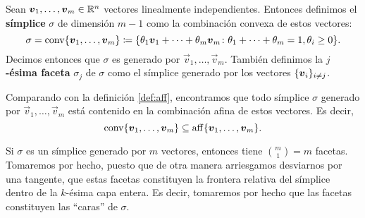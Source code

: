 \begin{definition}
	\label{def:simplex}
	Sean $\boldsymbol{v}_1, \ldots, \boldsymbol{v}_m \in \mathbb{R}^n$ vectores linealmente
	independientes. Entonces definimos el \textbf{símplice} $\sigma$ de
	dimensión $m - 1$ como la combinación convexa de estos vectores:
	\begin{equation*}
		\sigma = \operatorname{conv}\lbrace \boldsymbol{v}_1, \ldots, \boldsymbol{v}_m \rbrace
		\coloneq
		\lbrace \theta_1\boldsymbol{v}_1 + \cdots + \theta_m\boldsymbol{v}_m
		\colon \theta_1 + \cdots + \theta_m = 1, \theta_i \geq 0 \rbrace.
	\end{equation*}
	Decimos entonces que $\sigma$ es generado por $\vec{v}_1, \ldots, \vec{v}_m$. También definimos
	la \textbf{$j$-ésima faceta} $\sigma_j$ de $\sigma$ como el símplice generado por los vectores
	$\lbrace \boldsymbol{v}_i \rbrace_{i \neq j}$.
\end{definition}
\begin{observation}
	Comparando con la definición \ref{def:aff}, encontramos que todo símplice $\sigma$ generado por
	$\vec{v}_1, \ldots, \vec{v}_m$ está contenido en la combinación afina de estos vectores. Es
	decir,
	\begin{equation}
		\label{aff:contention}
		\operatorname{conv}\lbrace \boldsymbol{v}_1, \ldots, \boldsymbol{v}_m \rbrace \subseteq
		\operatorname{aff}\lbrace \boldsymbol{v}_1, \ldots, \boldsymbol{v}_m \rbrace.
	\end{equation}
\end{observation}
\begin{observation}
	Si $\sigma$ es un símplice generado por $m$ vectores, entonces tiene
	$\binom{m}{1} = m$ facetas. Tomaremos por hecho, puesto que de otra
	manera arriesgamos desviarnos por una tangente, que estas facetas
	constituyen la frontera relativa del símplice dentro de la $k$-ésima capa
	entera. Es decir, tomaremos por hecho que las facetas constituyen las
	``caras'' de $\sigma$.
\end{observation}

